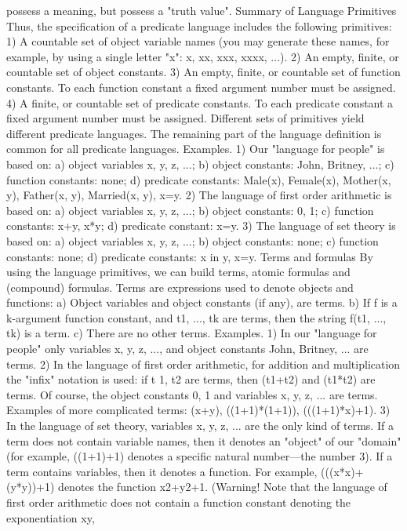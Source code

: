 possess a meaning, but possess a "truth value".
Summary of Language Primitives
Thus, the specification of a predicate language includes the following primitives:
1) A countable set of object variable names (you may generate these names, for example, by using a
single letter "x": x, xx, xxx, xxxx, ...).
2) An empty, finite, or countable set of object constants.
3) An empty, finite, or countable set of function constants. To each function constant a fixed argument
number must be assigned.
4) A finite, or countable set of predicate constants. To each predicate constant a fixed argument number
must be assigned.
Different sets of primitives yield different predicate languages. The remaining part of the language
definition is common for all predicate languages.
Examples. 1) Our "language for people" is based on: a) object variables x, y, z, ...; b) object constants: John, Britney, ...; c)
function constants: none; d) predicate constants: Male(x), Female(x), Mother(x, y), Father(x, y), Married(x, y), x=y.
2) The language of first order arithmetic is based on: a) object variables x, y, z, ...; b) object constants: 0, 1; c) function
constants: x+y, x*y; d) predicate constant: x=y.
3) The language of set theory is based on: a) object variables x, y, z, ...; b) object constants: none; c) function constants: none;
d) predicate constants: x in y, x=y.
Terms and formulas
By using the language primitives, we can build terms, atomic formulas and (compound) formulas.
Terms are expressions used to denote objects and functions:
a) Object variables and object constants (if any), are terms.
b) If f is a k-argument function constant, and t1, ..., tk are terms, then the string f(t1, ..., tk) is a term.
c) There are no other terms.
Examples. 1) In our "language for people" only variables x, y, z, ..., and object constants John, Britney, ... are terms.
2) In the language of first order arithmetic, for addition and multiplication the "infix" notation is used: if t 1, t2 are terms, then
(t1+t2) and (t1*t2) are terms. Of course, the object constants 0, 1 and variables x, y, z, ... are terms. Examples of more
complicated terms: (x+y), ((1+1)*(1+1)), (((1+1)*x)+1).
3) In the language of set theory, variables x, y, z, ... are the only kind of terms.
If a term does not contain variable names, then it denotes an "object" of our "domain" (for example,
((1+1)+1) denotes a specific natural number---the number 3). If a term contains variables, then it denotes
a function. For example, (((x*x)+(y*y))+1) denotes the function x2+y2+1. (Warning! Note that the
language of first order arithmetic does not contain a function constant denoting the exponentiation xy,
